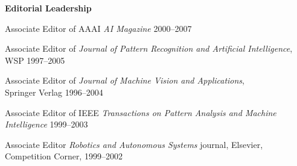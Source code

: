 \documentclass{article}
\begin{document}
\begin{cv}
\begin{cvlist} {\bf Editorial Leadership}
		\item Associate Editor of AAAI {\em AI
				Magazine}\cftdotfill{\cftdotsep} 2000--2007
		\item Associate Editor of {\em Journal of Pattern Recognition and
				Artificial Intelligence},\\ WSP \cftdotfill{\cftdotsep} 1997--2005
		\item Associate Editor of {\em Journal of Machine Vision and
				Applications},\\ Springer Verlag \cftdotfill{\cftdotsep} 1996--2004
		\item Associate Editor of IEEE {\em Transactions on Pattern Analysis
				and Machine\\ Intelligence} \cftdotfill{\cftdotsep} 1999--2003
		\item Associate Editor {\em Robotics and Autonomous Systems}
		journal, Elsevier, \\Competition Corner, \cftdotfill{\cftdotsep}
		1999--2002
	\end{cvlist}


\end{cv}
\end{document}
